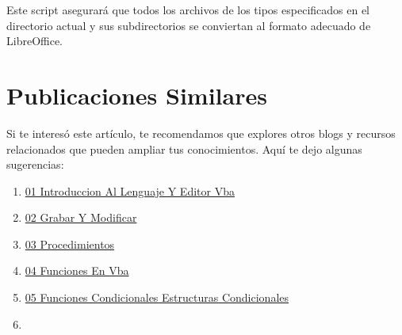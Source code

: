 \documentclass[
  jou,
  floatsintext,
  longtable,
  a4paper,
  nolmodern,
  notxfonts,
  notimes,
  colorlinks=true,linkcolor=blue,citecolor=blue,urlcolor=blue]{apa7}
\providecommand{\tightlist}{%
  \setlength{\itemsep}{0pt}\setlength{\parskip}{0pt}}
\begin{document}
Este script asegurará que todos los archivos de los tipos especificados
en el directorio actual y sus subdirectorios se conviertan al formato
adecuado de LibreOffice.

\section{Publicaciones Similares}\label{publicaciones-similares}

Si te interesó este artículo, te recomendamos que explores otros blogs y
recursos relacionados que pueden ampliar tus conocimientos. Aquí te dejo
algunas sugerencias:

\begin{enumerate}
\def\labelenumi{\arabic{enumi}.}
\tightlist
\item
  \href{https://achalmaedison.netlify.app/herramientas-oficina/ofimatica/2022-12-05-01-introduccion-al-lenguaje-y-editor-vba/index.pdf}{}
  \href{https://achalmaedison.netlify.app/herramientas-oficina/ofimatica/2022-12-05-01-introduccion-al-lenguaje-y-editor-vba}{01
  Introduccion Al Lenguaje Y Editor Vba}
\item
  \href{https://achalmaedison.netlify.app/herramientas-oficina/ofimatica/2022-12-12-02-grabar-y-modificar/index.pdf}{}
  \href{https://achalmaedison.netlify.app/herramientas-oficina/ofimatica/2022-12-12-02-grabar-y-modificar}{02
  Grabar Y Modificar}
\item
  \href{https://achalmaedison.netlify.app/herramientas-oficina/ofimatica/2022-12-19-03-procedimientos/index.pdf}{}
  \href{https://achalmaedison.netlify.app/herramientas-oficina/ofimatica/2022-12-19-03-procedimientos}{03
  Procedimientos}
\item
  \href{https://achalmaedison.netlify.app/herramientas-oficina/ofimatica/2022-12-26-04-funciones-en-vba/index.pdf}{}
  \href{https://achalmaedison.netlify.app/herramientas-oficina/ofimatica/2022-12-26-04-funciones-en-vba}{04
  Funciones En Vba}
\item
  \href{https://achalmaedison.netlify.app/herramientas-oficina/ofimatica/2023-01-02-05-funciones-condicionales-estructuras-condicionales/index.pdf}{}
  \href{https://achalmaedison.netlify.app/herramientas-oficina/ofimatica/2023-01-02-05-funciones-condicionales-estructuras-condicionales}{05
  Funciones Condicionales Estructuras Condicionales}
\item
  \href{https://achalmaedison.netlify.app/herramientas-oficina/ofimatica/2023-01-09-06-funciones-iterativas-estructuras-repetitivas-o-bucles/index.pdf}{}

\end{enumerate}
\end{document}
